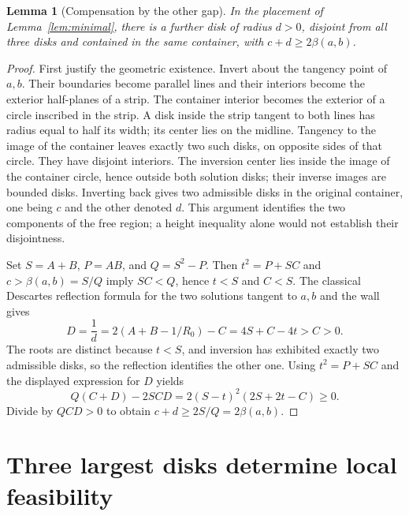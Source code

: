 \documentclass[11pt]{article}
\newtheorem{lemma}[theorem]{Lemma}
\theoremstyle{remark}
\newcommand{\bp}{\beta}
\begin{document}
\begin{lemma}[Compensation by the other gap]\label{lem:opposite}
In the placement of Lemma~\ref{lem:minimal}, there is a further disk
of radius $d>0$, disjoint from all three disks and contained in the
same container, with $c+d\ge2\bp(a,b)$.
\end{lemma}
\begin{proof}
First justify the geometric existence. Invert about the tangency point
of $a,b$. Their boundaries become parallel lines and their interiors
become the exterior half-planes of a strip. The container interior
becomes the exterior of a circle inscribed in the strip. A disk inside
the strip tangent to both lines has radius equal to half its width;
its center lies on the midline. Tangency to the image of the container
leaves exactly two such disks, on opposite sides of that circle. They
have disjoint interiors. The inversion center lies inside the image
of the container circle, hence outside both solution disks; their inverse
images are bounded disks. Inverting back gives two admissible disks in
the original container, one being $c$ and the other denoted $d$.
This argument identifies the two components of the free region; a
height inequality alone would not establish their disjointness.

Set $S=A+B$, $P=AB$, and $Q=S^2-P$. Then $t^2=P+SC$ and
$c>\bp(a,b)=S/Q$ imply $SC<Q$, hence $t<S$ and $C<S$.
The classical Descartes reflection formula for the two solutions
tangent to $a,b$ and the wall \cite[Section 3.3]{apollonian} gives
\[
 D=\frac1d=2(A+B-1/R_0)-C=4S+C-4t>C>0.
\]
The roots are distinct because $t<S$, and inversion has exhibited
exactly two admissible disks, so the reflection identifies the other one.
Using $t^2=P+SC$ and the displayed expression for $D$ yields
\[
 Q(C+D)-2SCD=2(S-t)^2(2S+2t-C)\ge0.
\]
Divide by $QCD>0$ to obtain $c+d\ge2S/Q=2\bp(a,b)$.
\end{proof}

\section{Three largest disks determine local feasibility}
\end{document}
